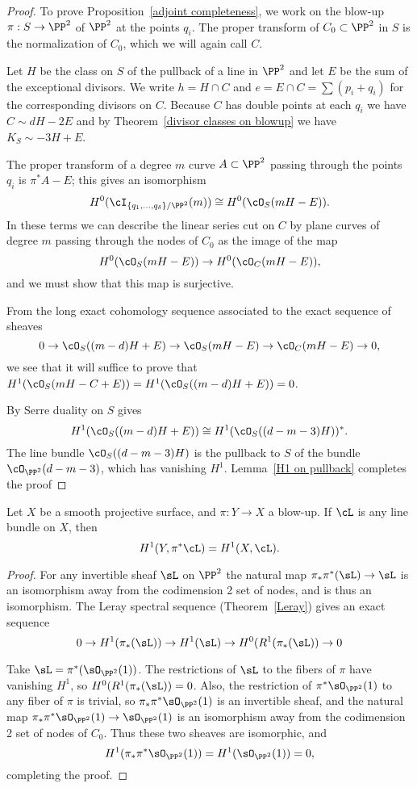 \begin{proof}
To prove Proposition~\ref{adjoint completeness}, we work on the blow-up $\pi : S \to \PP^2$ of $\PP^2$ at the points $q_i$. The proper transform of $C_0 \subset \PP^2$ in $S$ is the normalization of $C_0$, which we will again call $C$.

Let $H$ be the class on $S$ of the pullback of a line in $\PP^2$  and let $E$ be the sum of the exceptional divisors. We write $h= H\cap C$ and $e = E\cap C= \sum (p_i+q_i)$ for the corresponding divisors on $C$. 
Because $C$ has double points at each $q_{i}$ we have
$
C \sim dH - 2E 
$
and   by
Theorem~\ref{divisor classes on blowup} we have $K_S \sim -3H + E$.

The proper transform of a degree $m$ curve $A\subset \PP^2$  passing through the points $q_i$
is $\pi^*A - E$; this gives an isomorphism
$$
H^0(\cI_{\{q_1,\dots,q_\delta\}/\PP^2}(m)) \cong H^0(\cO_S(mH-E)).
$$
In these terms we can describe the linear series cut on $C$ by plane curves of degree $m$ passing through the nodes of $C_0$ as the image of the map
$$
H^0(\cO_S(mH-E)) \to H^0(\cO_C(mH-E)),
$$
and we must show that this map is surjective.

From the long exact cohomology sequence associated to the exact sequence of sheaves
$$
0 \to \cO_S((m-d)H + E)  \to \cO_S(mH-E) \to \cO_C(mH-E) \to 0,
$$
 we see that it will suffice to prove that $H^1(\cO_S(mH - C + E)) = H^1(\cO_S((m-d)H + E)) = 0$. 
 
By Serre duality on $S$ gives
$$
H^1(\cO_S((m-d)H + E)) \cong H^1(\cO_S((d-m-3)H))^*.
$$
The line bundle $\cO_S((d-m-3)H)$ is 
 the pullback to $S$ of the bundle $\cO_{\PP^2}(d-m-3)$, which has vanishing $H^1$. Lemma~\ref{H1 on pullback} completes the proof
\end{proof}

\begin{lemma}\label{H1 on pullback}
Let $X$ be a smooth projective surface, and $\pi : Y \to X$ a blow-up. If $\cL$ is any line bundle on $X$, then
$$
H^1(Y, \pi^*\cL) = H^1(X, \cL).
$$
\end{lemma}
\begin{proof}
For any invertible sheaf $\sL$ on $\PP^{2}$ the natural map $\pi_{*}\pi^{*}(\sL) \to \sL$ is an isomorphism
away from the codimension 2 set of nodes, and is thus an isomorphism. The Leray spectral sequence (Theorem~\ref{Leray}) gives an exact sequence
$$
0\to H^{1}(\pi_{*}(\sL)) \to H^{1}(\sL) \to  H^{0}(R^{1}(\pi_{*}(\sL))\to 0
$$

Take $\sL = \pi^{*}(\sO_{\PP^{2}}(1))$. The restrictions of $\sL$ to the fibers of $\pi$ have vanishing $H^{1}$,
so
$H^{0}(R^{1}(\pi_{*}(\sL)) = 0$.
Also, the restriction of $\pi^{*}\sO_{\PP^{2}}(1)$ to any fiber of $\pi$ is trivial,
so $\pi_{*}\pi^{*}\sO_{\PP^{2}}(1)$ is an invertible sheaf, and the natural map
$\pi_{*}\pi^{*}\sO_{\PP^{2}}(1) \to \sO_{\PP^{2}}(1)$ is an isomorphism away from the codimension
2 set of nodes of $C_{0}$. Thus these two sheaves are isomorphic, and
$$
H^{1}(\pi_{*}\pi^{*}\sO_{\PP^{2}}(1) ) = H^{1}(\sO_{\PP^{2}}(1)) = 0,
$$
completing the proof.
\end{proof}
